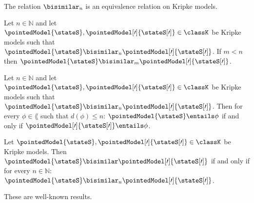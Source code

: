 \documentclass[twoside]{aiml14}
\begin{document}
  \begin{proposition}
      The relation $\bisimilar_n$ is an equivalence relation on Kripke models.
  \end{proposition}

  \begin{proposition}
      Let $n \in \mathbb{N}$ and 
      let $\pointedModel{\stateS}, \pointedModel[\prime]{\stateS[\prime]} \in \classK$ be Kripke models 
      such that $\pointedModel{\stateS} \bisimilar_n \pointedModel[\prime]{\stateS[\prime]}$. 
      If $m < n$ then $\pointedModel{\stateS} \bisimilar_m \pointedModel[\prime]{\stateS[\prime]}$. 
  \end{proposition}

  \begin{proposition}
      Let $n \in \mathbb{N}$ and 
      let $\pointedModel{\stateS}, \pointedModel[\prime]{\stateS[\prime]} \in \classK$ be Kripke models such that
      $\pointedModel{\stateS} \bisimilar_n \pointedModel[\prime]{\stateS[\prime]}$. 
      Then for every $\phi \in \lang$ such that $d(\phi) \leq n$:
      $\pointedModel{\stateS} \entails \phi$ if and only if $\pointedModel[\prime]{\stateS[\prime]} \entails \phi$.
  \end{proposition}

  \begin{proposition}
      Let $\pointedModel{\stateS}, \pointedModel[\prime]{\stateS[\prime]} \in \classK$ be Kripke models.
      Then $\pointedModel{\stateS} \bisimilar \pointedModel[\prime]{\stateS[\prime]}$
      if and only if for every $n \in \mathbb{N}$: 
      $\pointedModel{\stateS} \bisimilar_n \pointedModel[\prime]{\stateS[\prime]}$.
  \end{proposition}
  
  These are well-known results.
\end{document}

